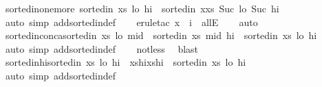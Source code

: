 \begin{isabellebody}
\isamarkupfalse%
\ sorted{\isacharunderscore}in{\isacharunderscore}one{\isacharunderscore}more{\isacharcolon}\ {\isachardoublequoteopen}sorted{\isacharunderscore}in\ xs\ lo\ hi\ {\isasymLongrightarrow}\ sorted{\isacharunderscore}in\ {\isacharparenleft}x{\isacharhash}xs{\isacharparenright}\ {\isacharparenleft}Suc\ lo{\isacharparenright}\ {\isacharparenleft}Suc\ hi{\isacharparenright}{\isachardoublequoteclose}\isanewline
%
\isadelimproof
\ \ %
\endisadelimproof
%
\isatagproof
{}\isamarkupfalse%
\ {\isacharparenleft}auto\ simp\ add{\isacharcolon}sorted{\isacharunderscore}in{\isacharunderscore}def{\isacharparenright}\isanewline
\ \ \isamarkupfalse%
\ {\isacharparenleft}erule{\isacharunderscore}tac\ {\isacharquery}x\ {\isacharequal}\ {\isachardoublequoteopen}i{\isacharminus}{}{\isachardoublequoteclose}\ \ allE{\isacharparenright}\isanewline
\ \ \isamarkupfalse%
\ auto\isanewline
\ \ \isamarkupfalse%
%
\endisatagproof
{\isafoldproof}%
%
\isadelimproof
\isanewline
%
\endisadelimproof
\isanewline
{}\isamarkupfalse%
\ sorted{\isacharunderscore}in{\isacharunderscore}conca{\isacharcolon}{\isachardoublequoteopen}sorted{\isacharunderscore}in\ xs\ lo\ mid\ {\isasymand}\ sorted{\isacharunderscore}in\ xs\ mid\ hi\ {\isasymLongrightarrow}\ sorted{\isacharunderscore}in\ xs\ lo\ hi{\isachardoublequoteclose}\isanewline
%
\isadelimproof
\ \ %
\endisadelimproof
%
\isatagproof
{}\isamarkupfalse%
\ {\isacharparenleft}auto\ simp\ add{\isacharcolon}sorted{\isacharunderscore}in{\isacharunderscore}def{\isacharparenright}\isanewline
\ \ \isamarkupfalse%
\ not{\isacharunderscore}less\ \isamarkupfalse%
\ blast%
\endisatagproof
{\isafoldproof}%
%
\isadelimproof
\isanewline
%
\endisadelimproof
\isanewline
{}\isamarkupfalse%
\ sorted{\isacharunderscore}in{\isacharunderscore}hi{\isacharcolon}{\isachardoublequoteopen}sorted{\isacharunderscore}in\ xs\ lo\ hi\ {\isasymand}\ xs{\isacharbang}hi{\isacharless}xs{\isacharbang}{\isacharparenleft}hi{\isacharplus}{}{\isacharparenright}\ {\isasymLongrightarrow}\ sorted{\isacharunderscore}in\ xs\ lo\ {\isacharparenleft}hi{\isacharplus}{}{\isacharparenright}{\isachardoublequoteclose}\isanewline
%
\isadelimproof
\ \ %
\endisadelimproof
%
\isatagproof
{}\isamarkupfalse%
\ {\isacharparenleft}auto\ simp\ add{\isacharcolon}sorted{\isacharunderscore}in{\isacharunderscore}def{\isacharparenright}\isanewline
\ \ \isamarkupfalse%

\end{isabellebody}
